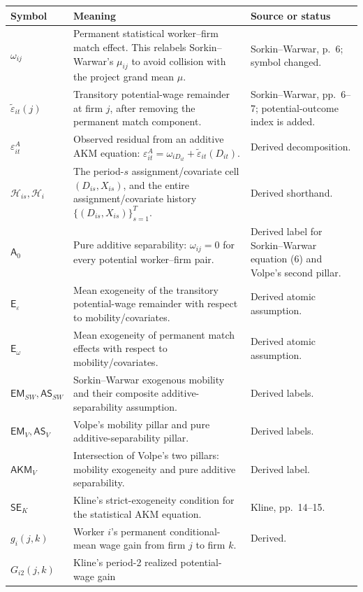 \documentclass[11pt]{article}
\begin{document}
\begin{longtable}{p{}p{}p{}}
\textbf{Symbol} & \textbf{Meaning} & \textbf{Source or status} \\
\hline
\(\omega_{ij}\) & Permanent statistical worker--firm match effect.  This
relabels Sorkin--Warwar's \(\mu_{ij}\) to avoid collision with the project
grand mean \(\mu\). & Sorkin--Warwar, p.\ 6; symbol changed. \\
\(\widetilde\varepsilon_{it}(j)\) & Transitory potential-wage remainder at
firm \(j\), after removing the permanent match component. & Sorkin--Warwar,
pp.\ 6--7; potential-outcome index is added. \\
\(\varepsilon^A_{it}\) & Observed residual from an additive AKM equation:
\(\varepsilon^A_{it}=\omega_{iD_{it}}+
\widetilde\varepsilon_{it}(D_{it})\). & Derived decomposition. \\
\(\mathcal H_{is},\mathcal H_i\) & The period-\(s\) assignment/covariate cell
\((D_{is},X_{is})\), and the entire assignment/covariate history
\(\{(D_{is},X_{is})\}_{s=1}^T\). & Derived shorthand. \\
\(\mathsf A_0\) & Pure additive separability:
\(\omega_{ij}=0\) for every potential worker--firm pair. & Derived label for
Sorkin--Warwar equation (6) and Volpe's second pillar. \\
\(\mathsf E_\varepsilon\) & Mean exogeneity of the transitory potential-wage
remainder with respect to mobility/covariates. & Derived atomic assumption. \\
\(\mathsf E_\omega\) & Mean exogeneity of permanent match effects with
respect to mobility/covariates. & Derived atomic assumption. \\
\(\mathsf{EM}_{SW},\mathsf{AS}_{SW}\) & Sorkin--Warwar exogenous mobility and
their composite additive-separability assumption. & Derived labels. \\
\(\mathsf{EM}_{V},\mathsf{AS}_{V}\) & Volpe's mobility pillar and pure
additive-separability pillar. & Derived labels. \\
\(\mathsf{AKM}_{V}\) & Intersection of Volpe's two pillars: mobility
exogeneity and pure additive separability. & Derived label. \\
\(\mathsf{SE}_{K}\) & Kline's strict-exogeneity condition for the statistical
AKM equation. & Kline, pp.\ 14--15. \\
\(g_i(j,k)\) & Worker \(i\)'s permanent conditional-mean wage gain from firm
\(j\) to firm \(k\). & Derived. \\
\(G_{i2}(j,k)\) & Kline's period-2 realized potential-wage gain

\end{longtable}
\end{document}
